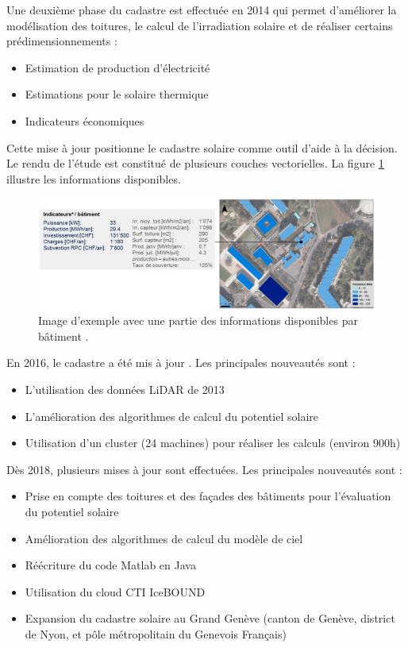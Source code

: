 \par{Une deuxième phase du cadastre est effectuée en 2014 \cite{desthieux_etude_2014} qui permet d'améliorer la modélisation des toitures, le calcul de l'irradiation solaire et de réaliser certains prédimensionnements :
\begin{itemize}
    \item Estimation de production d'électricité
    \item Estimations pour le solaire thermique
    \item Indicateurs économiques
\end{itemize}}
\par{Cette mise à jour positionne le cadastre solaire comme outil d'aide à la décision. Le rendu de l'étude est constitué de plusieurs couches vectorielles. La figure \ref{fig:cadastre_solaire_2014} illustre les informations disponibles.}
\begin{figure}[H]
    \centering
    \includegraphics[width=1\linewidth]{02-main//figures/cadastre_solaire_2014.png}
    \caption{Image d'exemple avec une partie des informations disponibles par bâtiment \cite{desthieux_etude_2014}.}
    \label{fig:cadastre_solaire_2014}
\end{figure}

\par{En 2016, le cadastre a été mis à jour \cite{desthieux_solar_2018}. Les principales nouveautés sont :
\begin{itemize}
    \item L'utilisation des données LiDAR de 2013 \cite{sitg_nuages_2013}
    \item L'amélioration des algorithmes de calcul du potentiel solaire
    \item Utilisation d'un cluster (24 machines) pour réaliser les calculs (environ 900h)
\end{itemize}}

\par{Dès 2018, plusieurs mises à jour \cite{desthieux_solar_2018} sont effectuées. Les principales nouveautés sont :
\begin{itemize}
    \item Prise en compte des toitures et des façades des bâtiments pour l'évaluation du potentiel solaire
    \item Amélioration des algorithmes de calcul du modèle de ciel
    \item Réécriture du code Matlab en Java
    \item Utilisation du cloud CTI IceBOUND
    \item Expansion du cadastre solaire au Grand Genève (canton de Genève, district de Nyon, et pôle métropolitain du Genevois Français)
\end{itemize}}

